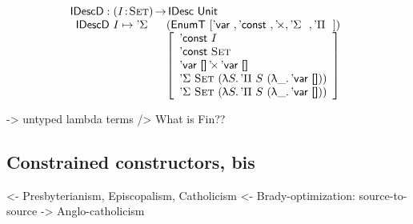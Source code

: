 \documentclass[preprint, authoryear]{sigplanconf}
\newenvironment{structure}{\footnotesize\verbatim}{\endverbatim}
\begin{document}
\[\stk{
\IDescD : \PI{\V{I}}{\Set} \IDesc{\Unit} \\
\begin{array}{ll}
\IDescD~I \mapsto \DSigma{}{} & (\EnumT [ \DVar{},
\DConst{},
                                                                                    \DProd{}{},
                                          \DSigma{}{}, 
                                          \DPi{}{} ]) \\
                              & \left[\begin{array}{l}
                                      \DConst{I}                  \\
                                      \DConst{\Set}               \\
                                      \DProd{\DVar{\Void}}{\DVar{\Void}}  \\
                                      \DSigma{\Set}{(\LAM{S} \DPi{S}{(\LAM{\_} \DVar{\Void})})} \\
                                      \DSigma{\Set}{(\LAM{S} \DPi{S}{(\LAM{\_} \DVar{\Void})})}
                                   \end{array}
                             \right]
\end{array}
}\]

\begin{structure}
    -> untyped lambda terms
        /> What is Fin??
\end{structure}

\subsection{Constrained constructors, bis}

\begin{structure}
<- Presbyterianism, Episcopalism, Catholicism
<- Brady-optimization: source-to-source
    -> Anglo-catholicism
\end{structure}


\end{document}
